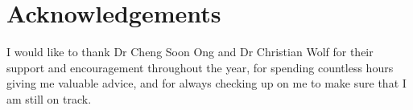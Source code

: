 
\chapter*{Acknowledgements}
\label{cha:ack}

I would like to thank Dr Cheng Soon Ong and Dr Christian Wolf for their support and encouragement
throughout the year, for spending countless hours giving me valuable advice,
and for always checking up on me to make sure that I am still on track.



